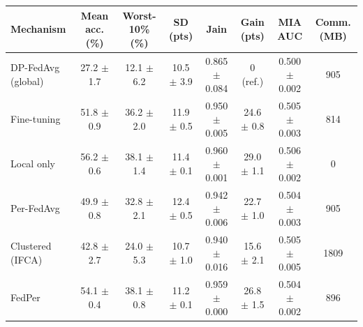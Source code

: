 \begin{tabular}{lccccccc}
\toprule
Mechanism & Mean acc. (\%) & Worst-10\% (\%) & SD (pts) & Jain & Gain (pts) & MIA AUC & Comm. (MB) \\
\midrule
DP-FedAvg (global) & 27.2 $\pm$ 1.7 & 12.1 $\pm$ 6.2 & 10.5 $\pm$ 3.9 & 0.865 $\pm$ 0.084 & 0 (ref.) & 0.500 $\pm$ 0.002 & 905 \\
Fine-tuning & 51.8 $\pm$ 0.9 & 36.2 $\pm$ 2.0 & 11.9 $\pm$ 0.5 & 0.950 $\pm$ 0.005 & 24.6 $\pm$ 0.8 & 0.505 $\pm$ 0.003 & 814 \\
Local only & 56.2 $\pm$ 0.6 & 38.1 $\pm$ 1.4 & 11.4 $\pm$ 0.1 & 0.960 $\pm$ 0.001 & 29.0 $\pm$ 1.1 & 0.506 $\pm$ 0.002 & 0 \\
Per-FedAvg & 49.9 $\pm$ 0.8 & 32.8 $\pm$ 2.1 & 12.4 $\pm$ 0.5 & 0.942 $\pm$ 0.006 & 22.7 $\pm$ 1.0 & 0.504 $\pm$ 0.003 & 905 \\
Clustered (IFCA) & 42.8 $\pm$ 2.7 & 24.0 $\pm$ 5.3 & 10.7 $\pm$ 1.0 & 0.940 $\pm$ 0.016 & 15.6 $\pm$ 2.1 & 0.505 $\pm$ 0.005 & 1809 \\
FedPer & 54.1 $\pm$ 0.4 & 38.1 $\pm$ 0.8 & 11.2 $\pm$ 0.1 & 0.959 $\pm$ 0.000 & 26.8 $\pm$ 1.5 & 0.504 $\pm$ 0.002 & 896 \\
\bottomrule
\end{tabular}
